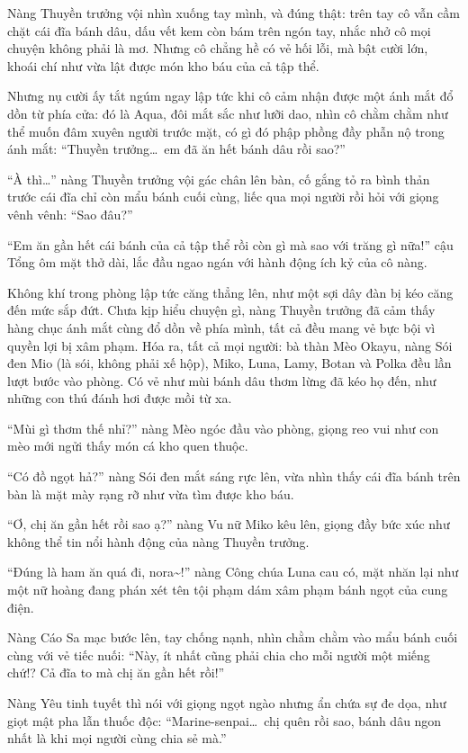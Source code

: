 \documentclass[../main.tex]{subfiles}
\begin{document}
Nàng Thuyền trưởng vội nhìn xuống tay mình, và đúng thật: trên tay cô vẫn cầm chặt cái đĩa bánh dâu, dấu vết kem còn bám trên ngón tay, nhắc nhở cô mọi chuyện không phải là mơ. Nhưng cô chẳng hề có vẻ hối lỗi, mà bật cười lớn, khoái chí như vừa lật được món kho báu của cả tập thể.

Nhưng nụ cười ấy tắt ngúm ngay lập tức khi cô cảm nhận được một ánh mắt đổ dồn từ phía cửa: đó là Aqua, đôi mắt sắc như lưỡi dao, nhìn cô chằm chằm như thể muốn đâm xuyên người trước mặt, có gì đó phập phồng đầy phẫn nộ trong ánh mắt: ``Thuyền trưởng\dots\ em đã ăn hết bánh dâu rồi sao?''

``À thì\dots'' nàng Thuyền trưởng vội gác chân lên bàn, cố gắng tỏ ra bình thản trước cái đĩa chỉ còn mẩu bánh cuối cùng, liếc qua mọi người rồi hỏi với giọng vênh vênh: ``Sao đâu?''

``Em ăn gần hết cái bánh của cả tập thể rồi còn gì mà sao với trăng gì nữa!'' cậu Tổng ôm mặt thở dài, lắc đầu ngao ngán với hành động ích kỷ của cô nàng.

Không khí trong phòng lập tức căng thẳng lên, như một sợi dây đàn bị kéo căng đến mức sắp đứt. Chưa kịp hiểu chuyện gì, nàng Thuyền trưởng đã cảm thấy hàng chục ánh mắt cùng đổ dồn về phía mình, tất cả đều mang vẻ bực bội vì quyền lợi bị xâm phạm. Hóa ra, tất cả mọi người: bà thàn Mèo Okayu, nàng Sói đen Mio (là sói, không phải xế hộp), Miko, Luna, Lamy, Botan và Polka đều lần lượt bước vào phòng. Có vẻ như mùi bánh dâu thơm lừng đã kéo họ đến, như những con thú đánh hơi được mồi từ xa.


``Mùi gì thơm thế nhỉ?'' nàng Mèo ngóc đầu vào phòng, giọng reo vui như con mèo mới ngửi thấy món cá kho quen thuộc.

``Có đồ ngọt hả?'' nàng Sói đen mắt sáng rực lên, vừa nhìn thấy cái đĩa bánh trên bàn là mặt mày rạng rỡ như vừa tìm được kho báu.

``Ơ, chị ăn gần hết rồi sao ạ?'' nàng Vu nữ Miko kêu lên, giọng đầy bức xúc như không thể tin nổi hành động của nàng Thuyền trưởng.

``Đúng là ham ăn quá đi, nora\~{}!'' nàng Công chúa Luna cau có, mặt nhăn lại như một nữ hoàng đang phán xét tên tội phạm dám xâm phạm bánh ngọt của cung điện.

Nàng Cáo Sa mạc bước lên, tay chống nạnh, nhìn chằm chằm vào mẩu bánh cuối cùng với vẻ tiếc nuối: ``Này, ít nhất cũng phải chia cho mỗi người một miếng chứ!? Cả đĩa to mà chị ăn gần hết rồi!''

Nàng Yêu tinh tuyết thì nói với giọng ngọt ngào nhưng ẩn chứa sự đe dọa, như giọt mật pha lẫn thuốc độc: ``Marine-senpai\dots\ chị quên rồi sao, bánh dâu ngon nhất là khi mọi người cùng chia sẻ mà.''
\end{document}
